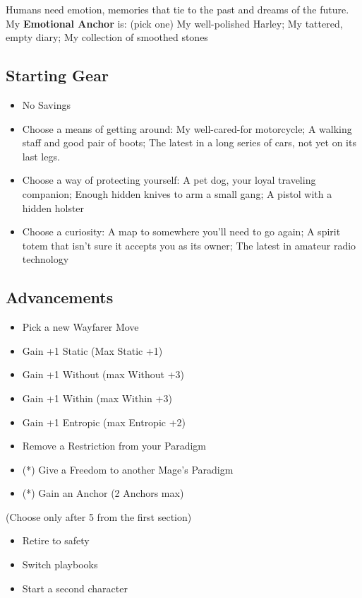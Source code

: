 \documentclass[
  oneside,
  statementpaper,
  9pt]{memoir}
\begin{document}
Humans need emotion, memories that tie to the past and dreams of the
future. My \textbf{Emotional Anchor} is: (pick one) My well-polished
Harley; My tattered, empty diary; My collection of smoothed stones

\hypertarget{starting-gear-8}{%
\subsection{Starting Gear}\label{starting-gear-8}}

\begin{itemize}
\tightlist
\item
  No Savings
\item
  Choose a means of getting around: My well-cared-for motorcycle; A
  walking staff and good pair of boots; The latest in a long series of
  cars, not yet on its last legs.
\item
  Choose a way of protecting yourself: A pet dog, your loyal traveling
  companion; Enough hidden knives to arm a small gang; A pistol with a
  hidden holster
\item
  Choose a curiosity: A map to somewhere you'll need to go again; A
  spirit totem that isn't sure it accepts you as its owner; The latest
  in amateur radio technology
\end{itemize}

\hypertarget{advancements-8}{%
\subsection{Advancements}\label{advancements-8}}

\begin{itemize}
\tightlist
\item
  Pick a new Wayfarer Move
\item
  Gain +1 Static (Max Static +1)
\item
  Gain +1 Without (max Without +3)
\item
  Gain +1 Within (max Within +3)
\item
  Gain +1 Entropic (max Entropic +2)
\item
  Remove a Restriction from your Paradigm
\item
  (*) Give a Freedom to another Mage's Paradigm
\item
  (*) Gain an Anchor (2 Anchors max)
\end{itemize}

(Choose only after 5 from the first section)

\begin{itemize}
\tightlist
\item
  Retire to safety
\item
  Switch playbooks
\item
  Start a second character
\end{itemize}
\end{document}
